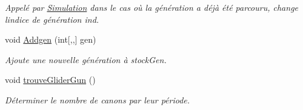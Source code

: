 \begin{DoxyCompactItemize}
\begin{DoxyCompactList}\small\item\em Appelé par \mbox{\hyperlink{class_simulation}{Simulation}} dans le cas où la génération a déjà été parcouru, change l\textquotesingle{}indice de génération ind. \end{DoxyCompactList}\item 
void \mbox{\hyperlink{class_detection_a92c60be1a69ea74b7f7bef04a0e53238}{Addgen}} (int\mbox{[},,\mbox{]} gen)
\begin{DoxyCompactList}\small\item\em Ajoute une nouvelle génération à stock\+Gen. \end{DoxyCompactList}\item 
void \mbox{\hyperlink{class_detection_aa21c434f39d4e9d901635d9db2a4bbca}{trouve\+Glider\+Gun}} ()
\begin{DoxyCompactList}\small\item\em Déterminer le nombre de canons par leur période. \end{DoxyCompactList}\end{DoxyCompactItemize}
